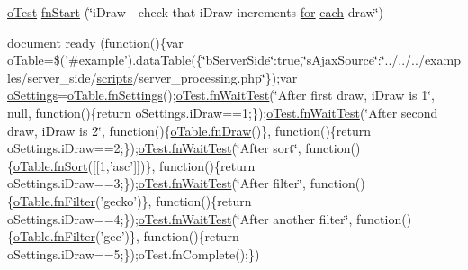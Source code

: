 \begin{DoxyCompactItemize}
\item 
\hyperlink{unit__test_8js_a3b2d259e2df3b6860d9047a92d09d0d6}{o\+Test} \hyperlink{4__server-side_2-i_draw_8js_ac498b325be60058f27a9eeb38a5e2140}{fn\+Start} (\char`\"{}i\+Draw -\/ check that i\+Draw increments \hyperlink{tinymce_8jquery_8dev_8js_a4675a875b20881bc5f7011f49fbd4da7}{for} \hyperlink{fullpage_2plugin_8min_8js_a536422939f8cd6b5867a8fb424c3c02e}{each} draw\char`\"{})
\item 
\hyperlink{outside_events_8js_aa14f8e0338cced6720590fd2ea13bd4b}{document} \hyperlink{4__server-side_2-i_draw_8js_a4a82ae834f77be589b218c61e6d72222}{ready} (function()\{var o\+Table=\$('\#example').data\+Table(\{\char`\"{}b\+Server\+Side\char`\"{}\+:true,\char`\"{}s\+Ajax\+Source\char`\"{}\+:\char`\"{}../../../examples/server\+\_\+side/\hyperlink{tinymce_8jquery_8dev_8js_a09066d4d580eeec222f858d588b4cdef}{scripts}/server\+\_\+processing.\+php\char`\"{}\});var \hyperlink{model_8settings_8js_a4857b9c813b4dea010668e9555d0aca7}{o\+Settings}=\hyperlink{api_8methods_8js_a78f387fab92a85c2cb7830bc5d8a6141}{o\+Table.\+fn\+Settings}();\hyperlink{onhold_24__server-side_2__zero__config_8js_ab25c4d596771c0133cdc45178ce72c3d}{o\+Test.\+fn\+Wait\+Test}(\char`\"{}After first draw, i\+Draw is 1\char`\"{}, null, function()\{return o\+Settings.\+i\+Draw==1;\});\hyperlink{onhold_24__server-side_2__zero__config_8js_ab25c4d596771c0133cdc45178ce72c3d}{o\+Test.\+fn\+Wait\+Test}(\char`\"{}After second draw, i\+Draw is 2\char`\"{}, function()\{\hyperlink{api_8methods_8js_a7d784b06cf5b465f5a7a28de8bcdc97b}{o\+Table.\+fn\+Draw}()\}, function()\{return o\+Settings.\+i\+Draw==2;\});\hyperlink{onhold_24__server-side_2__zero__config_8js_ab25c4d596771c0133cdc45178ce72c3d}{o\+Test.\+fn\+Wait\+Test}(\char`\"{}After sort\char`\"{}, function()\{\hyperlink{api_8methods_8js_abd2a0a0641381ef69bfd8ab3f81157e5}{o\+Table.\+fn\+Sort}(\mbox{[}\mbox{[}1,'asc'\mbox{]}\mbox{]})\}, function()\{return o\+Settings.\+i\+Draw==3;\});\hyperlink{onhold_24__server-side_2__zero__config_8js_ab25c4d596771c0133cdc45178ce72c3d}{o\+Test.\+fn\+Wait\+Test}(\char`\"{}After filter\char`\"{}, function()\{\hyperlink{api_8methods_8js_a7b6987d0a9ab9c5303d10ef62790885d}{o\+Table.\+fn\+Filter}('gecko')\}, function()\{return o\+Settings.\+i\+Draw==4;\});\hyperlink{onhold_24__server-side_2__zero__config_8js_ab25c4d596771c0133cdc45178ce72c3d}{o\+Test.\+fn\+Wait\+Test}(\char`\"{}After another filter\char`\"{}, function()\{\hyperlink{api_8methods_8js_a7b6987d0a9ab9c5303d10ef62790885d}{o\+Table.\+fn\+Filter}('gec')\}, function()\{return o\+Settings.\+i\+Draw==5;\});o\+Test.\+fn\+Complete();\})
\end{DoxyCompactItemize}


